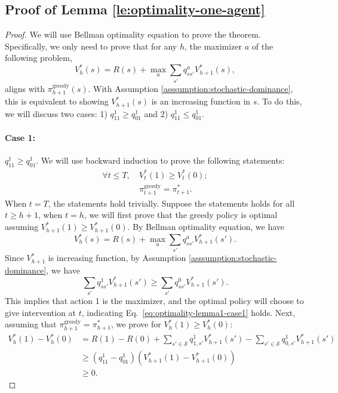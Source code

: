 \subsection{Proof of Lemma \ref{le:optimality-one-agent}}\label{app:optimality-one-agent}
\optimalOneAgent*
\begin{proof}
We will use Bellman optimality equation to prove the theorem. Specifically, we only need to prove that for any $h$, the maximizer $a$ of the following problem,
\begin{equation*}
    V_h^{*}(s)=R(s)+\max_{a}\sum_{s'}q_{ss'}^aV_{h+1}^{*}(s),
\end{equation*}
aligns with $\pi_{h+1}^{\text{greedy}}(s)$. With Assumption \ref{asssumption:stochastic-dominance}, this is equivalent to showing $V_{h+1}^{*}(s)$ is an increasing function in $s$. To do this, we will discuss two cases: 1) $q_{11}^1\geq q_{01}^1$ and 2) $q_{11}^1\leq q_{01}^1$.
\paragraph{Case 1: } $q^1_{11}\geq q^1_{01}$. We will use backward induction to prove the following
statements:
\begin{align}
    \forall t\leq T,~&V^*_t(1)\geq V_t^*(0)\label{eq:monotonicity-lemma1-case1};\\
    &\pi_{t+1}^{\text{greedy}}=\pi_{t+1}^*\label{eq:optimality-lemma1-case1}.
\end{align}
When $t=T$, the statements hold trivially. Suppose the statements holds for all $t\geq h+1$, when $t=h$, we will first prove that the greedy policy is optimal assuming
$V^*_{h+1}(1)\geq V_{h+1}^*(0)$.
By Bellman optimality equation, we have
\begin{equation*}
    V_h^*(s)=R(s)+\max_{a}\sum_{s'}q^a_{ss'}V_{h+1}^*\left(s'\right).
\end{equation*}
Since $V_{h+1}^*$ is increasing function, by Assumption \ref{asssumption:stochastic-dominance}, we have
\begin{equation*}
    \sum_{s'}q^1_{ss'}V_{h+1}^*\left(s'\right)\geq \sum_{s'}q^0_{ss'}V_{h+1}^*\left(s'\right).
\end{equation*}
This implies that action 1 is the maximizer, and 
the optimal policy will choose to give intervention at $t$, indicating
Eq.~\eqref{eq:optimality-lemma1-case1} holds.
Next, assuming that
$\pi_{h+1}^{\text{greedy}}=\pi_{h+1}^*$,
we prove for  $V^*_{h}(1)\geq V_{h}^*(0)$:
    \begin{align*}
        V_h^*(1)-V_h^*(0)&=R(1)-R(0)+\sum_{s'\in\mathcal{S}}q^1_{1,s'}V_{h+1}^*(s')-\sum_{s'\in\mathcal{S}}q^1_{0,s'}V_{h+1}^*(s')\\
        &\geq \left(q^1_{11}-q^1_{01}\right)\left(V_{h+1}^*(1)-V_{h+1}^*(0)\right)\\
        &\geq 0.
    \end{align*}

\end{proof}
